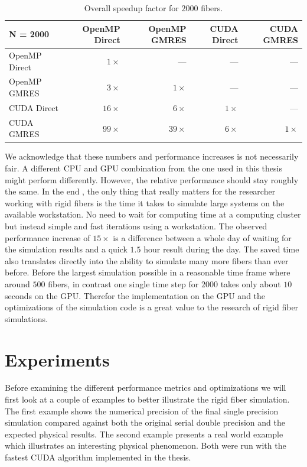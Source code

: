 \documentclass[a4paper,11pt]{kth-mag}
\begin{document}
\begin{table}[!htbp]
  \begin{center}
    \begin{tabulary}{\textwidth}{lRRRR}
      \toprule
      N = 2000 & OpenMP Direct & OpenMP GMRES & CUDA Direct & CUDA GMRES \\
      \midrule
      OpenMP Direct & $1×$  & $—$   & $—$ & $—$ \\
      OpenMP GMRES  & $3×$  & $1×$  & $—$ & $—$ \\
      CUDA Direct   & $16×$ & $6×$  & $1×$ & $—$ \\
      CUDA GMRES    & $99×$ & $39×$ & $6×$ & $1×$ \\
      \bottomrule
    \end{tabulary}
  \end{center}
  \caption{Overall speedup factor for $2000$ fibers.}
  \label{tab:overall_speedup}
\end{table}

We acknowledge that these numbers and performance increases is not necessarily fair. A different CPU and GPU combination from the one used in this thesis might perform differently. However, the relative performance should stay roughly the same. In the end , the only thing that really matters for the researcher working with rigid fibers is the time it takes to simulate large systems on the available workstation. No need to wait for computing time at a computing cluster but instead simple and fast iterations using a workstation. The observed performance increase of $15×$ is a difference between a whole day of waiting for the simulation results and a quick $1.5$ hour result during the day. The saved time also translates directly into the ability to simulate many more fibers than ever before. Before the largest simulation possible in a reasonable time frame where around $500$ fibers, in contrast one single time step for $2000$ takes only about $10$ seconds on the GPU. Therefor the implementation on the GPU and the optimizations of the simulation code is a great value to the research of rigid fiber simulations.

\chapter{Experiments}

Before examining the different performance metrics and optimizations we will first look at a couple of examples to better illustrate the rigid fiber simulation. The first example shows the numerical precision of the final single precision simulation compared against both the original serial double precision and the expected physical results. The second example presents a real world example which illustrates an interesting physical phenomenon. Both were run with the fastest CUDA algorithm implemented in the thesis.
\end{document}
